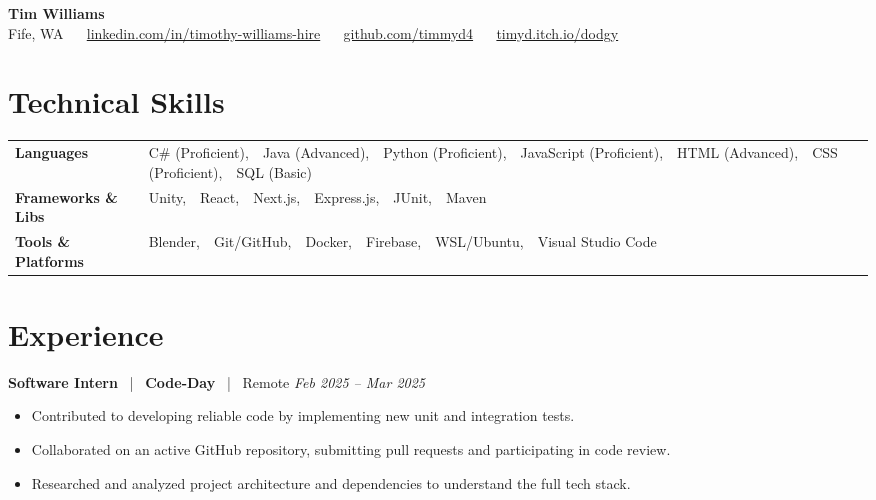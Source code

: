 \documentclass[10pt, letterpaper]{article}
\newcommand{\jobhead}[4]{%
  \vspace{5pt}%
  {\bfseries\color{dark}#1}%
  ~{\color{light}|}~%
  {\bfseries\color{navy}#2}%
  ~{\color{light}|}~%
  {\color{light}#3}%
  \hfill{\color{light}\small\textit{#4}}\\[-2pt]%
}
\newcommand{\skillrow}[2]{%
  {\bfseries #1} & #2 \\[2pt]%
}
\begin{document}

\begin{center}
  {\huge\bfseries\color{navy} Tim Williams}\\[4pt]
  {\small\color{light}
    Fife, WA
    ~\textbullet~
    \href{https://linkedin.com/in/timothy-williams-hire}{linkedin.com/in/timothy-williams-hire}
    ~\textbullet~
    \href{https://github.com/timmyd4}{github.com/timmyd4}
    ~\textbullet~
    \href{https://timyd.itch.io/dodgy}{timyd.itch.io/dodgy}
  }
\end{center}

\vspace{2pt}

\section{Technical Skills}

\begin{tabular}{@{}p{1.6in} p{5.2in}@{}}
  \skillrow{Languages}{C\# (Proficient),\ \ Java (Advanced),\ \ Python (Proficient),\ \ JavaScript (Proficient),\ \ HTML (Advanced),\ \ CSS (Proficient),\ \ SQL (Basic)}
  \skillrow{Frameworks \& Libs}{Unity,\ \ React,\ \ Next.js,\ \ Express.js,\ \ JUnit,\ \ Maven}
  \skillrow{Tools \& Platforms}{Blender,\ \ Git/GitHub,\ \ Docker,\ \ Firebase,\ \ WSL/Ubuntu,\ \ Visual Studio Code}
\end{tabular}

\section{Experience}

\jobhead{Software Intern}{Code-Day}{Remote}{Feb 2025 – Mar 2025}
\begin{itemize}
  \item Contributed to developing reliable code by implementing new unit and integration tests.
  \item Collaborated on an active GitHub repository, submitting pull requests and participating in code review.
  \item Researched and analyzed project architecture and dependencies to understand the full tech stack.
\end{itemize}
\end{document}
